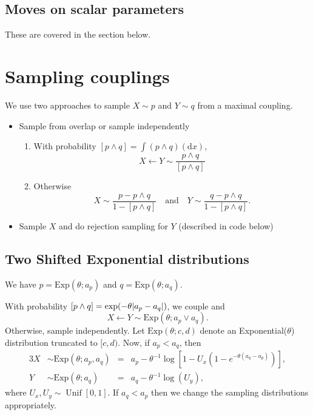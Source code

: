 \documentclass[11pt,a4paper]{article}
\newcommand{\Exp}[1]{\mathrm{Exp}(#1)}
\DeclarePairedDelimiter\abs{\lvert}{\rvert}%
\DeclareMathOperator*{\Unif}{\mathrm{Unif}}
\begin{document}
\subsection*{Moves on scalar parameters}

These are covered in the section below.


\section*{Sampling couplings}

We use two approaches to sample $ X \sim p $ and $ Y \sim q $ from a maximal coupling.
\begin{itemize}
    \item Sample from overlap or sample independently
    \begin{enumerate}
        \item With probability $ [p \wedge q] = \int (p \wedge q)(\mathrm{d} x) $,
        \[
            X \leftarrow Y \sim \frac{p \wedge q}{[p \wedge q]}
        \]
        \item Otherwise
        \[
            X \sim \frac{p - p \wedge q}{1 - [p \wedge q]}
            \quad \text{and} \quad
            Y \sim \frac{q - p \wedge q}{1 - [p \wedge q]}.
        \]
    \end{enumerate}
    \item Sample $ X $ and do rejection sampling for $ Y $ (described in code below)
\end{itemize}

\subsection*{Two Shifted Exponential distributions}

We have $ p = \Exp{\theta; a_p} $ and $ q = \Exp{\theta; a_q} $.

With probability $ [p \wedge q] = \exp(-\theta \abs{a_p - a_q}) $, we couple and
\[
X \leftarrow Y \sim \Exp{\theta; a_p \vee a_q}.
\]
Otherwise, sample independently. Let $ \Exp{\theta; c, d} $ denote an Exponential($ \theta $) distribution truncated to $ [c, d) $. Now, if $ a_p < a_q $, then
\begin{alignat*}{3}
    X &\sim \Exp{\theta; a_p, a_q}
        &=& a_p - \theta^{-1} \log[1 - U_x (1 - e^{-\theta (a_q - a_p)})], \\
    Y &\sim \Exp{\theta; a_q}
        &=& a_q - \theta^{-1} \log(U_y),
\end{alignat*}
where $ U_x, U_y \sim \Unif[0, 1] $. If $ a_q < a_p $ then we change the sampling distributions appropriately.
\end{document}
